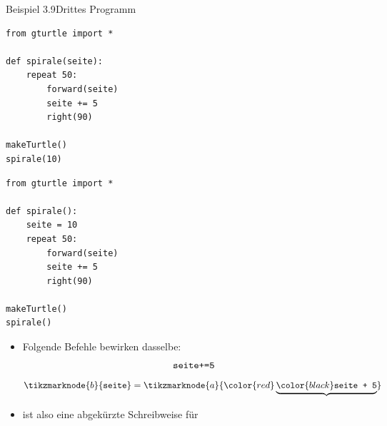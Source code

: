 \begin{frame}[fragile]{Beispiel 3.9}{Drittes Programm}
\begin{minipage}[c]{.49\linewidth}
    \begin{lstlisting}[style=TigerJython, basicstyle=\scriptsize]
from gturtle import *

def spirale(seite):
    repeat 50:
        forward(seite)
        seite += 5
        right(90)

makeTurtle()
spirale(10)    
\end{lstlisting}
\end{minipage}\hfill
\begin{minipage}[c]{.49\linewidth}
    \begin{lstlisting}[style=TigerJython, basicstyle=\scriptsize]
from gturtle import *

def spirale():
    seite = 10
    repeat 50:
        forward(seite)
        seite += 5
        right(90)

makeTurtle()
spirale()   
\end{lstlisting}
\end{minipage}

\begin{itemize}
    \item<2-> Folgende Befehle bewirken dasselbe:\\
    \scriptsize
\begin{equation}
    \text{\texttt{seite+=5}}
\end{equation}
\begin{equation}
    \tikzmarknode{b}{\text{\texttt{seite}}} =\tikzmarknode{a}{\color{red}\underbrace{\color{black}\text{\texttt{seite + 5}}}}
\end{equation}
\normalsize
    \item<3>  ist also eine abgekürzte Schreibweise für 
    
\end{itemize}
\end{frame}

